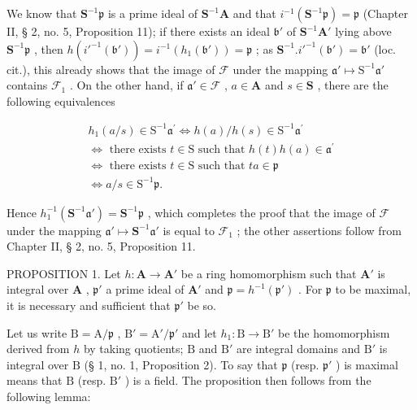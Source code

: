 We know that \(\mathbf{S}^{-1}\mathfrak{p}\) is a prime ideal of \(\mathbf{S}^{-1}\mathbf{A}\) and that \(i^{-1}(\mathbf{S}^{-1}\mathfrak{p}) = \mathfrak{p}\) (Chapter II, § 2, no. 5, Proposition 11); if there exists an ideal \(\mathfrak{b}'\) of \(\mathbf{S}^{-1}\mathbf{A}'\) lying above \(\mathbf{S}^{-1}\mathfrak{p}\) , then \(h(i'^{-1}(\mathfrak{b}')) = i^{-1}(h_1(\mathfrak{b}')) = \mathfrak{p}\) ; as \(\mathbf{S}^{-1}.i'^{-1}(\mathfrak{b}') = \mathfrak{b}'\) (loc. cit.), this already shows that the image of \(\mathcal{F}\) under the mapping \(\mathfrak{a}'\mapsto\mathrm{S}^{-1}\mathfrak{a}'\) contains \(\mathcal{F}_{1}\) . On the other hand, if \(\mathfrak{a}'\in\mathcal{F}\) , \(a\in\mathbf{A}\) and \(s\in\mathbf{S}\) , there are the following equivalences

\[
\begin{array}{l} h _ {1} (a / s) \in \mathrm{S} ^ {- 1} \mathfrak {a} ^ {\prime} \Leftrightarrow h (a) / h (s) \in \mathrm{S} ^ {- 1} \mathfrak {a} ^ {\prime} \\ \Leftrightarrow \text { there   exists } t \in \mathrm{S} \text { such   that } h (t) h (a) \in \mathfrak {a} ^ {\prime} \\ \Leftrightarrow \text { there   exists } t \in \mathrm{S} \text { such   that } t a \in \mathfrak {p} \\ \Leftrightarrow a / s \in \mathrm{S} ^ {- 1} \mathfrak {p}. \end{array}
\]

Hence \(h_1^{-1}(\mathbf{S}^{-1}\mathfrak{a}') = \mathbf{S}^{-1}\mathfrak{p}\) , which completes the proof that the image of \(\mathcal{F}\) under the mapping \(\mathfrak{a}' \mapsto \mathbf{S}^{-1}\mathfrak{a}'\) is equal to \(\mathcal{F}_1\) ; the other assertions follow from Chapter II, § 2, no. 5, Proposition 11.

PROPOSITION 1. Let \(h: \mathbf{A} \to \mathbf{A}'\) be a ring homomorphism such that \(\mathbf{A}'\) is integral over \(\mathbf{A}\) , \(\mathfrak{p}'\) a prime ideal of \(\mathbf{A}'\) and \(\mathfrak{p} = h^{-1}(\mathfrak{p}')\) . For \(\mathfrak{p}\) to be maximal, it is necessary and sufficient that \(\mathfrak{p}'\) be so.

Let us write \(\mathrm{B} = \mathrm{A} / \mathfrak{p}\) , \(\mathrm{B}' = \mathrm{A}' / \mathfrak{p}'\) and let \(h_1 \colon \mathrm{B} \to \mathrm{B}'\) be the homomorphism derived from \(h\) by taking quotients; \(\mathrm{B}\) and \(\mathrm{B}'\) are integral domains and \(\mathrm{B}'\) is integral over \(\mathrm{B}\) (§ 1, no. 1, Proposition 2). To say that \(\mathfrak{p}\) (resp. \(\mathfrak{p}'\) ) is maximal means that \(\mathrm{B}\) (resp. \(\mathrm{B}'\) ) is a field. The proposition then follows from the following lemma:

